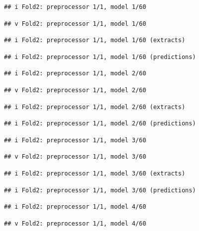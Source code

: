 \documentclass[
]{article}
\begin{document}
\begin{verbatim}
## i Fold2: preprocessor 1/1, model 1/60
\end{verbatim}

\begin{verbatim}
## v Fold2: preprocessor 1/1, model 1/60
\end{verbatim}

\begin{verbatim}
## i Fold2: preprocessor 1/1, model 1/60 (extracts)
\end{verbatim}

\begin{verbatim}
## i Fold2: preprocessor 1/1, model 1/60 (predictions)
\end{verbatim}

\begin{verbatim}
## i Fold2: preprocessor 1/1, model 2/60
\end{verbatim}

\begin{verbatim}
## v Fold2: preprocessor 1/1, model 2/60
\end{verbatim}

\begin{verbatim}
## i Fold2: preprocessor 1/1, model 2/60 (extracts)
\end{verbatim}

\begin{verbatim}
## i Fold2: preprocessor 1/1, model 2/60 (predictions)
\end{verbatim}

\begin{verbatim}
## i Fold2: preprocessor 1/1, model 3/60
\end{verbatim}

\begin{verbatim}
## v Fold2: preprocessor 1/1, model 3/60
\end{verbatim}

\begin{verbatim}
## i Fold2: preprocessor 1/1, model 3/60 (extracts)
\end{verbatim}

\begin{verbatim}
## i Fold2: preprocessor 1/1, model 3/60 (predictions)
\end{verbatim}

\begin{verbatim}
## i Fold2: preprocessor 1/1, model 4/60
\end{verbatim}

\begin{verbatim}
## v Fold2: preprocessor 1/1, model 4/60
\end{verbatim}
\end{document}
